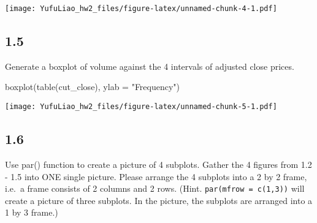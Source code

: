 \documentclass[
]{article}
\newenvironment{Shaded}{\begin{snugshade}}{\end{snugshade}}
\newcommand{\AttributeTok}[1]{\textcolor[rgb]{0.77,0.63,0.00}{#1}}
\newcommand{\DecValTok}[1]{\textcolor[rgb]{0.00,0.00,0.81}{#1}}
\newcommand{\FunctionTok}[1]{\textcolor[rgb]{0.00,0.00,0.00}{#1}}
\newcommand{\NormalTok}[1]{#1}
\newcommand{\OtherTok}[1]{\textcolor[rgb]{0.56,0.35,0.01}{#1}}
\newcommand{\SpecialCharTok}[1]{\textcolor[rgb]{0.00,0.00,0.00}{#1}}
\newcommand{\StringTok}[1]{\textcolor[rgb]{0.31,0.60,0.02}{#1}}
\begin{document}
\begin{Shaded}
\end{Shaded}

\texttt{[image: YufuLiao\_hw2\_files/figure-latex/unnamed-chunk-4-1.pdf]}

\hypertarget{section-4}{%
\subsection{1.5}\label{section-4}}

Generate a boxplot of volume against the 4 intervals of adjusted close
prices.

\begin{Shaded}
\begin{Highlighting}[]
\FunctionTok{boxplot}\NormalTok{(}\FunctionTok{table}\NormalTok{(cut\_close), }\AttributeTok{ylab =} \StringTok{"Frequency"}\NormalTok{)}
\end{Highlighting}
\end{Shaded}

\texttt{[image: YufuLiao\_hw2\_files/figure-latex/unnamed-chunk-5-1.pdf]}

\hypertarget{section-5}{%
\subsection{1.6}\label{section-5}}

Use par() function to create a picture of 4 subplots. Gather the 4
figures from 1.2 - 1.5 into ONE single picture. Please arrange the 4
subplots into a 2 by 2 frame, i.e.~a frame consists of 2 columns and 2
rows. (Hint. \texttt{par(mfrow\ =\ c(1,3))} will create a picture of
three subplots. In the picture, the subplots are arranged into a 1 by 3
frame.)
\end{document}

